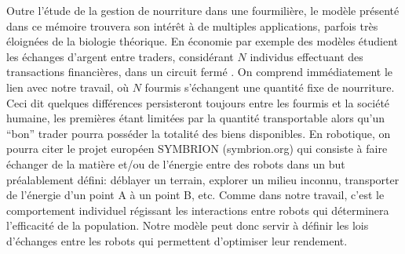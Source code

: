  
Outre l'étude de la gestion de nourriture dans une fourmilière, le modèle présenté dans ce mémoire trouvera son intérêt à de multiples applications, parfois très éloignées de la biologie théorique. En économie par exemple des modèles étudient les échanges d'argent entre traders, considérant $N$ individus effectuant des transactions financières, dans un circuit fermé \citep{lopez-ruiz_complex_2012}. On comprend immédiatement le lien avec notre travail, où $N$ fourmis s'échangent une quantité fixe de nourriture. Ceci dit quelques différences persisteront toujours entre les fourmis et la société humaine, les premières étant limitées par la quantité transportable alors qu'un ``bon'' trader pourra posséder la totalité des biens disponibles. En robotique, on pourra citer le projet européen SYMBRION (symbrion.org) qui consiste à faire échanger de la matière et/ou de l'énergie entre des robots dans un but préalablement défini: déblayer un terrain, explorer un milieu inconnu, transporter de l'énergie d'un point A à un point B, etc. Comme dans notre travail, c'est le comportement individuel régissant les interactions entre robots qui déterminera l'efficacité de la population. Notre modèle peut donc servir à définir les lois d'échanges entre les robots qui permettent d'optimiser leur rendement.
